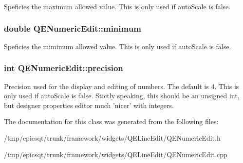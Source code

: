 \label{classQENumericEdit_a75a9a0d20f9a2065356cc6bf786a90af}
Speficies the maximum allowed value. This is only used if autoScale is false. \hypertarget{classQENumericEdit_ad23a555e16ec2dc0c3ba1df5e7801bf2}{
\subsubsection[{minimum}]{\setlength{\rightskip}{0pt plus 5cm}double QENumericEdit::minimum}}
\label{classQENumericEdit_ad23a555e16ec2dc0c3ba1df5e7801bf2}
Speficies the mimimum allowed value. This is only used if autoScale is false. \hypertarget{classQENumericEdit_a005bc482d26e66ecb9936abca60f5c63}{
\subsubsection[{precision}]{\setlength{\rightskip}{0pt plus 5cm}int QENumericEdit::precision}}
\label{classQENumericEdit_a005bc482d26e66ecb9936abca60f5c63}
Precision used for the display and editing of numbers. The default is 4. This is only used if autoScale is false. Stictly speaking, this should be an unsigned int, but designer properties editor much 'nicer' with integers. 

The documentation for this class was generated from the following files:\begin{DoxyCompactItemize}
\item 
/tmp/epicsqt/trunk/framework/widgets/QELineEdit/QENumericEdit.h\item 
/tmp/epicsqt/trunk/framework/widgets/QELineEdit/QENumericEdit.cpp\end{DoxyCompactItemize}
